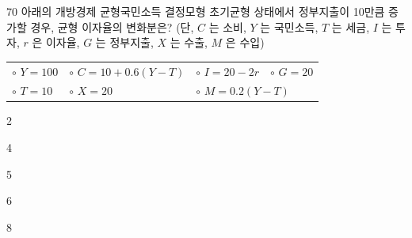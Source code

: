 \begin{question}{70}
아래의 개방경제 균형국민소득 결정모형 초기균형 상태에서 정부지출이 10만큼 증가할 경우, 균형 이자율의 변화분은? (단, $C$ 는 소비, $Y$ 는 국민소득, $T$ 는 세금, $I$ 는 투자, $r$ 은 이자율, $G$ 는 정부지출, $X$ 는 수출, $M$ 은 수입)
\begin{framedtext}
\begin{tabular}{@{}lll@{\qquad}l@{}}
$\circ$ $Y=100$ & $\circ$ $C=10+0.6(Y-T)$ & $\circ$ $I=20-2r$ & $\circ$ $G=20$ \\
$\circ$ $T=10$ & $\circ$ $X=20$ & \multicolumn{2}{l}{$\circ$ $M=0.2(Y-T)$}
\end{tabular}
\end{framedtext}
\begin{choices}
  \item 2
  \item 4
  \item 5
  \item 6
  \item 8
\end{choices}
\end{question}
